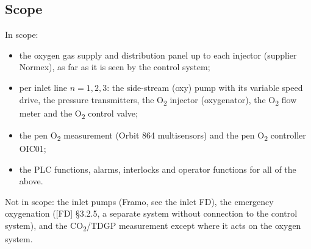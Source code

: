 \documentclass[11pt,a4paper]{article}
\newcommand{\Otwo}{O\textsubscript{2}}
\begin{document}
\subsection{Scope}
In scope:
\begin{itemize}[nosep]
  \item the oxygen gas supply and distribution panel up to each injector (supplier Normex), as far
        as it is seen by the control system;
  \item per inlet line $n = 1,2,3$: the side-stream (oxy) pump with its variable speed drive, the
        pressure transmitters, the \Otwo{} injector (oxygenator), the \Otwo{} flow meter and the
        \Otwo{} control valve;
  \item the pen \Otwo{} measurement (Orbit 864 multisensors) and the pen \Otwo{} controller OIC01;
  \item the PLC functions, alarms, interlocks and operator functions for all of the above.
\end{itemize}
Not in scope: the inlet pumps (Framo, see the inlet FD), the emergency oxygenation ([FD] \S3.2.5,
a separate system without connection to the control system), and the CO\textsubscript{2}/TDGP
measurement except where it acts on the oxygen system.
\end{document}

